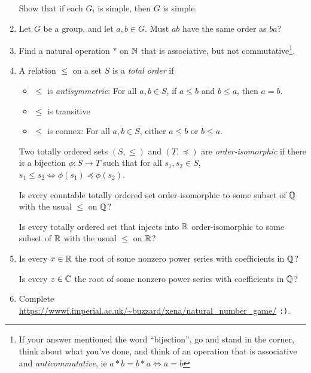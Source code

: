\documentclass[a4paper,12pt]{article}
\begin{document}
\begin{enumerate}[leftmargin=*]
  Show that if each \(G_i\) is simple, then \(G\) is simple.
 \item
  Let \(G\) be a group, and let \(a, b \in G\). Must \(ab\) have the same order
  as \(ba\)?
 \item
  Find a natural operation \(\ast\) on \(\mathbb N\) that is associative, but not
  commutative\footnote{If your answer mentioned the word ``bijection'', go and
  stand in the corner, think about what you've done, and think of an operation
  that is associative and \emph{anticommutative}, ie
  \(a \ast b = b \ast a \iff a = b\)}.
 \item
  A relation \(\le\) on a set \(S\) is a \emph{total order} if
  \begin{itemize}
   \item
    \(\le\) is \emph{antisymmetric}: For all \(a, b \in S\), if \(a \le b\) and
    \(b \le a\), then \(a = b\).
   \item
    \(\le\) is transitive
   \item
    \(\le\) is connex: For all \(a, b \in S\), either
    \(a \le b\) or \(b \le a\).
  \end{itemize}
  Two totally ordered sets \((S, \le)\) and \((T, \preceq)\) are
  \emph{order-isomorphic} if there is a bijection \(\phi: S \to T\) such that
  for all \(s_1, s_2 \in S\),
  \(s_1 \le s_2 \iff \phi(s_1) \preceq \phi(s_2)\).

  Is every countable totally ordered set order-isomorphic to some subset of
  \(\mathbb Q\) with the usual \(\le\) on \(\mathbb Q\)?

  Is every totally ordered set that injects into \(\mathbb R\) order-isomorphic to some
  subset of \(\mathbb R\) with the usual \(\le\) on \(\mathbb R\)?
 \item
  Is every \(x \in \mathbb R\) the root of some nonzero power series with coefficients
  in \(\mathbb Q\)?

  Is every \(z \in \mathbb C\) the root of some nonzero power series with coefficients
  in \(\mathbb Q\)?
 \item
  Complete \url{https://wwwf.imperial.ac.uk/~buzzard/xena/natural_number_game/}
  \texttt{:)}.


\end{enumerate}
\end{document}
